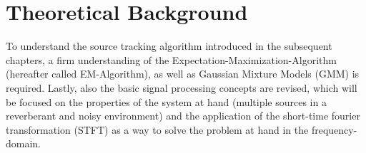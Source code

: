 \chapter[Theoretical Background]{Theoretical Background}
\label{chap:Theoretical Background}
To understand the source tracking algorithm introduced in the subsequent chapters, a firm understanding of the Expectation-Maximization-Algorithm (hereafter called EM-Algorithm), as well as Gaussian Mixture Models (GMM) is required. Lastly, also the basic signal processing concepts are revised, which will be focused on the properties of the system at hand (multiple sources in a reverberant and noisy environment) and the application of the short-time fourier transformation (STFT) as a way to solve the problem at hand in the frequency-domain.